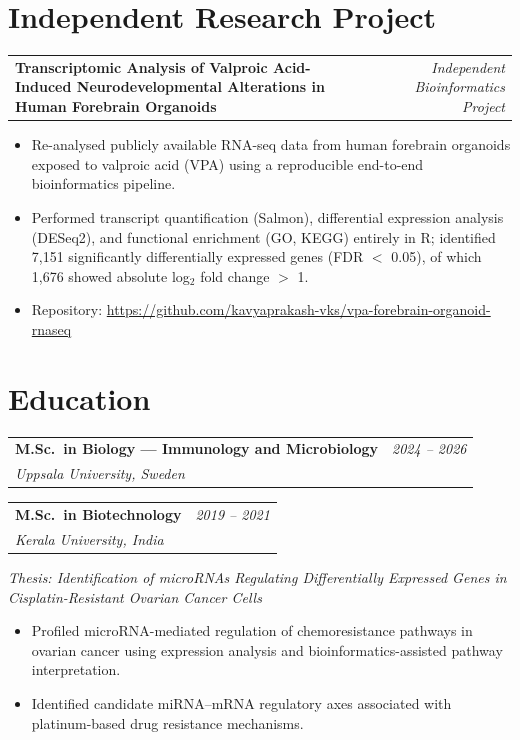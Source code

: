 \documentclass[10pt, a4paper]{article}
\makeatletter
\newcommand{\entry}[3]{%
  \begin{tabularx}{\linewidth}{@{}X r@{}}
    \textbf{#1} & \textit{#3} \\
    \textit{#2} & \\
  \end{tabularx}%
}
\newcommand{\entryflat}[2]{%
  \begin{tabularx}{\linewidth}{@{}X r@{}}
    \textbf{#1} & \textit{#2} \\
  \end{tabularx}%
}
\makeatother
\begin{document}
\vspace{2pt}

\section{Independent Research Project}

\entryflat
{Transcriptomic Analysis of Valproic Acid-Induced Neurodevelopmental Alterations in Human Forebrain Organoids}
{Independent Bioinformatics Project}

\vspace{3pt}

\begin{itemize}
\item Re-analysed publicly available RNA-seq data from human forebrain organoids exposed to
      valproic acid (VPA) using a reproducible end-to-end bioinformatics pipeline.
\item Performed transcript quantification (Salmon), differential expression analysis (DESeq2),
      and functional enrichment (GO, KEGG) entirely in R; identified 7,151 significantly
      differentially expressed genes (FDR $<$ 0.05), of which 1,676 showed absolute
      log$_2$ fold change $>$ 1.
\item Repository: \url{https://github.com/kavyaprakash-vks/vpa-forebrain-organoid-rnaseq}
\end{itemize}



\vspace{2pt}

\section{Education}

\entry{M.Sc.\ in Biology --- Immunology and Microbiology}{Uppsala University, Sweden}{2024 -- 2026}

\vspace{4pt}

\entry{M.Sc.\ in Biotechnology}{Kerala University, India}{2019 -- 2021}
\vspace{1pt}
\textit{Thesis: Identification of microRNAs Regulating Differentially Expressed Genes in Cisplatin-Resistant Ovarian Cancer Cells}
\begin{itemize}
  \item Profiled microRNA-mediated regulation of chemoresistance pathways in ovarian cancer
        using expression analysis and bioinformatics-assisted pathway interpretation.
  \item Identified candidate miRNA--mRNA regulatory axes associated with platinum-based drug
        resistance mechanisms.
\end{itemize}
\end{document}
